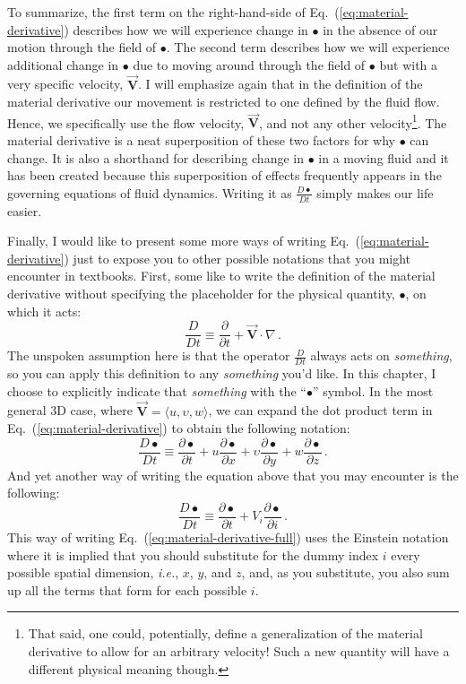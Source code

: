 To summarize, the first term on the right-hand-side of Eq.~(\ref{eq:material-derivative}) describes how we will experience change in $\bullet$ in the absence of our motion through the field of $\bullet$. The second term describes how we will experience additional change in $\bullet$ due to moving around through the field of $\bullet$ but with a very specific velocity, $\vec{\bm{V}}$. I will emphasize again that in the definition of the material derivative our movement is restricted to one defined by the fluid flow. Hence, we specifically use the flow velocity, $\vec{\bm{V}}$, and not any other velocity\footnote{That said, one could, potentially, define a generalization of the material derivative to allow for an arbitrary velocity! Such a new quantity will have a different physical meaning though.}. The material derivative is a neat superposition of these two factors for why $\bullet$ can change. It is also a shorthand for describing change in $\bullet$ in a moving fluid and it has been created because this superposition of effects frequently appears in the governing equations of fluid dynamics. Writing it as $\frac{D \bullet}{D t}$ simply makes our life easier.

Finally, I would like to present some more ways of writing Eq.~(\ref{eq:material-derivative}) just to expose you to other possible notations that you might encounter in textbooks. 
First, some like to write the definition of the material derivative without specifying the placeholder for the physical quantity, $\bullet$, on which it acts:
\begin{equation} \label{eq:material-derivative-no-placeholder}
\frac{D }{D t} \equiv \frac{\partial}{\partial t} + \vec{\bm{V}} \cdot \nabla \, .
\end{equation}
The unspoken assumption here is that the operator $\frac{D }{D t}$ always acts on \textit{something}, so you can apply this definition to any \textit{something} you'd like. In this chapter, I choose to explicitly indicate that \textit{something} with the ``$\bullet$'' symbol.
In the most general 3D case, where $\vec{\bm{V}} = \langle u, \upsilon, w \rangle$, we can expand the dot product term in Eq.~(\ref{eq:material-derivative}) to obtain the following notation:
\begin{equation} \label{eq:material-derivative-full}
\frac{D \bullet}{D t} \equiv \frac{\partial \bullet}{\partial t} + u \frac{\partial \bullet}{\partial x} + \upsilon \frac{\partial \bullet}{\partial y} + w \frac{\partial \bullet}{\partial z} \, .
\end{equation}
And yet another way of writing the equation above that you may encounter is the following:
\begin{equation} \label{eq:material-derivative-ein stein}
\frac{D \bullet}{D t} \equiv \frac{\partial \bullet}{\partial t} + V_i \frac{\partial \bullet}{\partial i} \, .
\end{equation}
This way of writing Eq.~(\ref{eq:material-derivative-full}) uses the Einstein notation where it is implied that you should substitute for the dummy index $i$ every possible spatial dimension, \textit{i.e.}, $x$, $y$, and $z$, and, as you substitute, you also sum up all the terms that form for each possible $i$.

